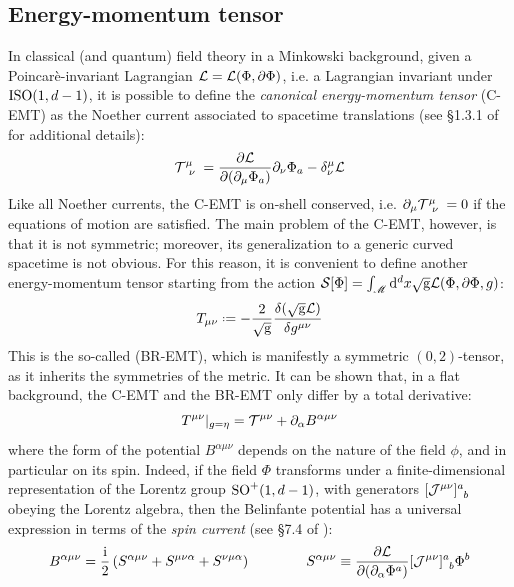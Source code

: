\subsection{Energy-momentum tensor}

In classical (and quantum) field theory in a Minkowski background, given a Poincarè-invariant Lagrangian $ \mathcal{L} = \mathcal{L}(\Phi , \partial \Phi) $, i.e. a Lagrangian invariant under $ \mathrm{ISO}(1,d-1) $, it is possible to define the \emph{canonical energy-momentum tensor} (C-EMT) as the Noether current associated to spacetime translations (see \S 1.3.1 of \cite{leonardo} for additional details):
\begin{equation}
  \tensor{\mathcal{T}}{^\mu_\nu} = \frac{\pa \lag}{\pa (\pa_\mu \Phi_a)} \pa_\nu \Phi_a - \delta^\mu_\nu \lag
\end{equation}
Like all Noether currents, the C-EMT is on-shell conserved, i.e. $ \pa_\mu \tensor{\mathcal{T}}{^\mu_\nu} = 0 $ if the equations of motion are satisfied.
The main problem of the C-EMT, however, is that it is not symmetric; moreover, its generalization to a generic curved spacetime is not obvious. For this reason, it is convenient to define another energy-momentum tensor starting from the action $ \mathcal{S}[\Phi] = \int_\mathscr{M} \mathrm{d}^d x \sqrt{\mathrm{g}} \mathcal{L}(\Phi , \partial \Phi , g) $:
\begin{equation}
  T_{\mu \nu} \defeq - \frac{2}{\sqg} \frac{\delta (\sqg \lag)}{\delta g^{\mu \nu}}
  \label{eq:em-tens-def}
\end{equation}
This is the so-called  (BR-EMT), which is manifestly a symmetric $ (0,2) $-tensor, as it inherits the symmetries of the metric. It can be shown that, in a flat background, the C-EMT and the BR-EMT only differ by a total derivative:
\begin{equation}
  T^{\mu \nu} \vert_{g = \eta} = \mathcal{T}^{\mu \nu} + \partial_\alpha B^{\alpha \mu \nu}
\end{equation}
where the form of the potential $ B^{\alpha \mu \nu} $ depends on the nature of the field $ \phi $, and in particular on its spin. Indeed, if the field $ \Phi $ transforms under a finite-dimensional representation of the Lorentz group $ \mathrm{SO}^+(1,d-1) $, with generators $ \tensor{[\mathcal{J}^{\mu \nu}]}{^a_b} $ obeying the Lorentz algebra\footnotemark, then the Belinfante potential has a universal expression in terms of the \emph{spin current} (see \S 7.4 of \cite{weinberg}):
\begin{equation}
  B^{\alpha \mu \nu} = \frac{\img}{2} \left( S^{\alpha \mu \nu} + S^{\mu \nu \alpha} + S^{\nu \mu \alpha} \right)
  \qquad \qquad
  S^{\alpha \mu \nu} \equiv \frac{\pa \lag}{\pa (\pa_\alpha \Phi^a)} \tensor{[\mathcal{J}^{\mu \nu}]}{^a_b} \Phi^b
\end{equation}
